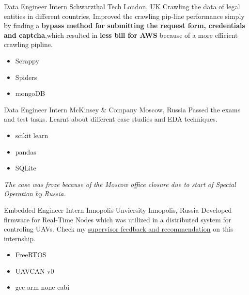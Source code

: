                 {Data Engineer Intern}
                {Schwarzthal Tech}
                {London, UK}
                {
                \newline
                Crawling the data of legal entities in different countries, Improved the crawling pip-line performance simply by finding a  \textbf{bypass method for submitting the request form, credentials and captcha},which resulted in \textbf{less bill for AWS} because of a more efficient crawling pipline.  } 
                {
                \begin{itemize}
                    \item Scrappy
                    \item Spiders
                    \item mongoDB
                \end{itemize}
                }
        
        {Data Engineer Intern}
        {McKinsey \& Company}
        {Moscow, Russia}
        {
        \newline
        Passed the exams and test tasks.
        Learnt about different case studies and EDA techniques.
        } 
        {
        \begin{itemize}
            \item scikit learn
            \item pandas
            \item SQLite
        \end{itemize}
        \textit{The case was froze because of the Moscow office closure due to start of Special Operation by Russia.}
        }
        

        {Embedded Engineer Intern}
        {Innopolis Unviersity}
        {Innopolis, Russia}
        {
        \newline
        Developed firmware for Real-Time Nodes which was utilized in a distributed system for controling UAVs. Check my \href{https://drive.google.com/file/d/1Msw5tk7niDSDpVlNeaLCsUIQxlgREYcV/edit?disco=AAAAl5Y7Zx0}{\color{blue} supervisor feedback and recommendation} on this internship.
        }
        {
        \begin{itemize}
            \item FreeRTOS
            \item UAVCAN v0
            \item gcc-arm-none-eabi
        \end{itemize}
        }


